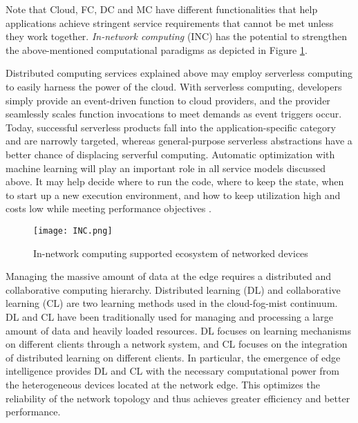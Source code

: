 Note that Cloud, FC, DC and MC have different functionalities that help applications achieve stringent service requirements that cannot be met unless they work together. \textit{In-network computing} (INC) has the potential to strengthen the above-mentioned computational paradigms as depicted in Figure \ref{fig:INC}. 

Distributed computing services explained above may employ serverless computing  to easily harness the power of the cloud. With serverless computing, developers simply provide an event-driven function to cloud providers, and the provider seamlessly scales function invocations to meet demands as event triggers occur. Today, successful serverless products fall into the application-specific category and are narrowly targeted, whereas general-purpose serverless abstractions have a better chance of displacing serverful computing. %
Automatic optimization with machine learning will play an important role in all service models discussed above. It may help decide where to run the code, where to keep the state, when to start up a new execution environment, and how to keep utilization high and costs low while meeting performance objectives \cite{10.1145/3406011}. 


\begin{figure}
    \centering
    \texttt{[image: INC.png]}
    \caption{In-network computing supported ecosystem of networked devices}
    \label{fig:INC}
\end{figure}


Managing the massive amount of data at the edge requires a distributed and collaborative computing hierarchy. Distributed learning (DL) and collaborative learning (CL) are two learning methods used in the cloud-fog-mist continuum.  DL and CL have been traditionally used for managing and processing a large amount of data and heavily loaded resources. DL focuses on learning mechanisms on different clients through a network system, and CL focuses on the integration of distributed learning on different clients. In particular, the emergence of edge intelligence provides DL and CL with the necessary computational power from the heterogeneous devices located at the network edge.  This optimizes the reliability of the network topology and thus achieves greater efficiency and better performance.

